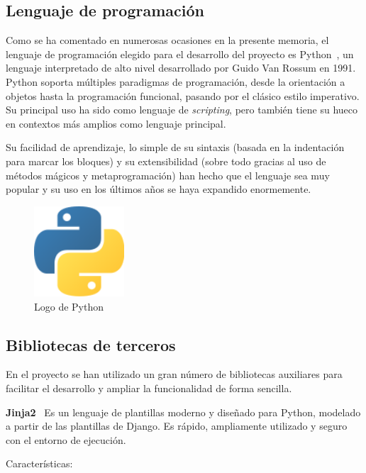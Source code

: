 \subsection{Lenguaje de programación}

Como se ha comentado en numerosas ocasiones en la presente memoria, el lenguaje
de programación elegido para el desarrollo del proyecto es Python~\cite{python}, un
lenguaje interpretado de alto nivel desarrollado por Guido Van Rossum en 1991.
Python soporta múltiples paradigmas de programación, desde la orientación a objetos
hasta la programación funcional, pasando por el clásico estilo imperativo. Su
principal uso ha sido como lenguaje de \textit{scripting}, pero también tiene su hueco en
contextos más amplios como lenguaje principal.

Su facilidad de aprendizaje, lo simple de su sintaxis (basada en la indentación
para marcar los bloques) y su extensibilidad (sobre todo gracias al uso de métodos
mágicos y metaprogramación) han hecho que el lenguaje sea muy popular y su uso
en los últimos años se haya expandido enormemente.

\begin{figure}[htbp]
    \centering
    \includegraphics[width=0.3\textwidth]{6_implementacion/python_logo}
    \caption{Logo de Python}
    \label{fig:python-logo}
\end{figure}

\subsection{Bibliotecas de terceros}

En el proyecto se han utilizado un gran número de bibliotecas auxiliares para
facilitar el desarrollo y ampliar la funcionalidad de forma sencilla.

\textbf{Jinja2}~\cite{jinja} Es un lenguaje de plantillas moderno y diseñado para Python, modelado a partir de las plantillas de Django.
Es rápido, ampliamente utilizado y seguro con el entorno de ejecución.

Características:


